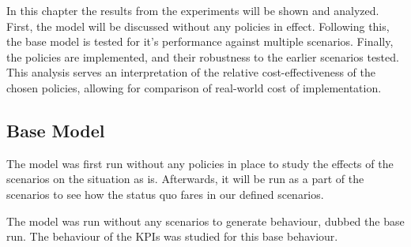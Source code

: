 In this chapter the results from the experiments will be shown and analyzed. First, the model will be discussed without any policies in effect. Following this, the base model is tested for it's performance against multiple scenarios. Finally, the policies are implemented, and their robustness to the earlier scenarios tested. This analysis serves an interpretation of the relative cost-effectiveness of the chosen policies, allowing for comparison of real-world cost of implementation. 

\subsection{Base Model}

The model was first run without any policies in place to study the effects of the scenarios on the situation as is. Afterwards, it will be run as a part of the scenarios to see how the status quo fares in our defined scenarios. 

The model was run without any scenarios to generate behaviour, dubbed the base run. The behaviour of the KPIs was studied for this base behaviour.

